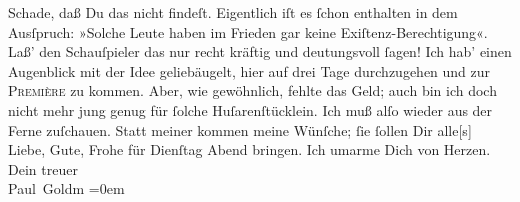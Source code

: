 \begin{ledgroupsized}[t]{13cm}
           \pstart
           {\pb}Schade, daß Du das \label{K_L02789-3v}\label{K_L02789-3h} nicht findeſt.  Eigentlich iſt es  ſchon enthalten in dem Ausſpruch: »Solche Leute haben im Frieden gar
                  keine Exiſtenz-Berechtigung«. Laß’ den Schauſpieler das nur recht kräftig und deutungsvoll
               ſagen!\pend
           \pstart
           Ich hab’ einen Augenblick mit der Idee geliebäugelt, hier auf drei Tage durchzugehen
               und zur \textsc{Première} zu kommen. Aber, wie gewöhnlich, fehlte
               das Geld; auch bin ich doch nicht mehr jung genug für ſolche Huſarenſtücklein. Ich
               muß alſo wieder aus der Ferne zuſchauen. Statt meiner kommen meine Wünſche; ſie
               ſollen Dir alle{[}s{]} Liebe, Gute, Frohe für Dienſtag{ }Abend bringen. Ich umarme Dich von Herzen.\pend
           \pstart
           Dein treuer {\\[\baselineskip]}\spacefill\mbox{Paul Goldm}\pend
           \leftskip=0em{}\pstart
           \noindent{}\label{T_L02789-1v}\label{T_L02789-1h}\pend
           
         
         \endnumbering{}\end{ledgroupsized}  \newcommand{\dateiname}{L02789}\newcommand{\titel}{Paul Goldmann an Arthur Schnitzler, 1. 11. [1896]}\newcommand{\editorInnen}{Martin Anton Müller und Laura Untner}
      